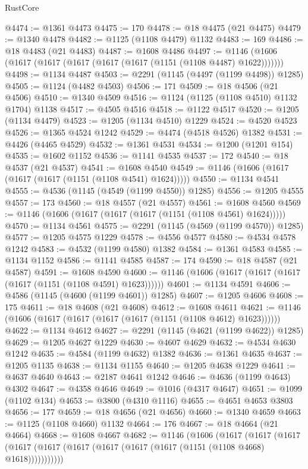 \begin{lexlean}{RustCore}
\begin{coremodule}
@4474 := @1361 @4473
@4475 := 170
@4478 := @18 @4475 (@21 @4475)
@4479 := @1340 @4478
@4482 := @1125 (@1108 @4479) @1132
@4483 := 169
@4486 := @18 @4483 (@21 @4483)
@4487 := @1608 @4486
@4497 := @1146 (@1606 (@1617 (@1617 (@1617 (@1617 (@1617 (@1151 (@1108 @4487) @1622)))))))
@4498 := @1134 @4487
@4503 := @2291 (@1145 (@4497 (@1199 @4498)) @1285)
@4505 := @1124 (@4482 @4503)
@4506 := 171
@4509 := @18 @4506 (@21 @4506)
@4510 := @1340 @4509
@4516 := @1124 (@1125 (@1108 @4510) @1132 @1704) @1138
@4517 := @4505 @4516
@4518 := @1122 @4517
@4520 := @1205 (@1134 @4479)
@4523 := @1205 (@1134 @4510) @1229
@4524 := @4520 @4523
@4526 := @1365 @4524 @1242
@4529 := @4474 (@4518 @4526) @1382
@4531 := @4426 (@4465 @4529)
@4532 := @1361 @4531
@4534 := @1200 (@1201 @154)
@4535 := @1602 @1152
@4536 := @1141 @4535
@4537 := 172
@4540 := @18 @4537 (@21 @4537)
@4541 := @1608 @4540
@4549 := @1146 (@1606 (@1617 (@1617 (@1617 (@1151 (@1108 @4541) @1624)))))
@4550 := @1134 @4541
@4555 := @4536 (@1145 (@4549 (@1199 @4550)) @1285)
@4556 := @1205 @4555
@4557 := 173
@4560 := @18 @4557 (@21 @4557)
@4561 := @1608 @4560
@4569 := @1146 (@1606 (@1617 (@1617 (@1617 (@1151 (@1108 @4561) @1624)))))
@4570 := @1134 @4561
@4575 := @2291 (@1145 (@4569 (@1199 @4570)) @1285)
@4577 := @1205 @4575 @1229
@4578 := @4556 @4577
@4580 := @4534 @4578 @1242
@4583 := @4532 (@1199 @4580) @1382
@4584 := @1361 @4583
@4585 := @1134 @1152
@4586 := @1141 @4585
@4587 := 174
@4590 := @18 @4587 (@21 @4587)
@4591 := @1608 @4590
@4600 := @1146 (@1606 (@1617 (@1617 (@1617 (@1617 (@1151 (@1108 @4591) @1623))))))
@4601 := @1134 @4591
@4606 := @4586 (@1145 (@4600 (@1199 @4601)) @1285)
@4607 := @1205 @4606
@4608 := 175
@4611 := @18 @4608 (@21 @4608)
@4612 := @1608 @4611
@4621 := @1146 (@1606 (@1617 (@1617 (@1617 (@1617 (@1151 (@1108 @4612) @1623))))))
@4622 := @1134 @4612
@4627 := @2291 (@1145 (@4621 (@1199 @4622)) @1285)
@4629 := @1205 @4627 @1229
@4630 := @4607 @4629
@4632 := @4534 @4630 @1242
@4635 := @4584 (@1199 @4632) @1382
@4636 := @1361 @4635
@4637 := @1205 @1135
@4638 := @1134 @1155
@4640 := @1205 @4638 @1229
@4641 := @4637 @4640
@4643 := @2187 @4641 @1242
@4646 := @4636 (@1199 @4643) @4302
@4647 := @4358 @4646
@4649 := @1016 (@4317 @4647)
@4651 := @1099 (@1102 @134)
@4653 := @3800 (@4310 @1116)
@4655 := @4651 @4653 @3803
@4656 := 177
@4659 := @18 @4656 (@21 @4656)
@4660 := @1340 @4659
@4663 := @1125 (@1108 @4660) @1132
@4664 := 176
@4667 := @18 @4664 (@21 @4664)
@4668 := @1608 @4667
@4682 := @1146
    (@1606
      (@1617
        (@1617
          (@1617 (@1617 (@1617 (@1617 (@1617 (@1617 (@1617 (@1151 (@1108 @4668) @1618)))))))))))

\end{coremodule}
\end{lexlean}
